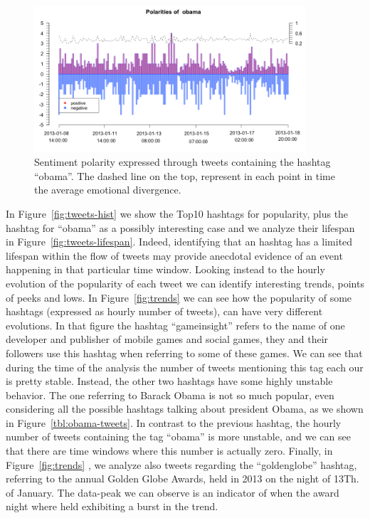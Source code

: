 \begin{figure}[!Ht]
\includegraphics[width=0.9\textwidth]{images/obama-sentiment.png} 
\caption{Sentiment polarity expressed through tweets containing the hashtag ``obama''. The dashed line on the top, represent in each point in time the average emotional divergence.}
\label{fig:obama-sentiment}
\end{figure}


In Figure~\ref{fig:tweets-hist} we show the Top10 hashtags for popularity, plus the hashtag for ``obama'' as a possibly interesting case  and we analyze their lifespan in Figure~\ref{fig:tweets-lifespan}.
Indeed, identifying that an hashtag has a limited lifespan within the flow of tweets may provide anecdotal evidence of an event happening in that  particular time window.
Looking instead to the hourly evolution of the popularity of each tweet we can identify interesting trends, points of peeks and lows.
In Figure~\ref{fig:trends} we can see how the popularity of some hashtags (expressed as hourly number of tweets), can have very different evolutions.
In that figure the hashtag ``gameinsight'' refers to the name of one developer and publisher of mobile games and social games, they and their followers use this hashtag when referring to some of these games.
We can see that during the time of the analysis the number of tweets mentioning this tag each our is pretty stable.
Instead, the other two hashtags have some highly unstable behavior.
The one referring to Barack Obama is not so much popular, even considering all the possible hashtags talking about president Obama, as we shown in Figure~\ref{tbl:obama-tweets}.
In contrast to the previous hashtag, the hourly number of tweets containing the tag ``obama'' is more unstable, and we can see that there are time windows where this number is actually zero.
Finally, in Figure~\ref{fig:trends} , we analyze also tweets regarding the ``goldenglobe'' hashtag, referring to the annual Golden Globe Awards, held in 2013 on the night of 13Th. of January.
The data-peak we can observe is an indicator of when the award night where held exhibiting a burst in the trend.

